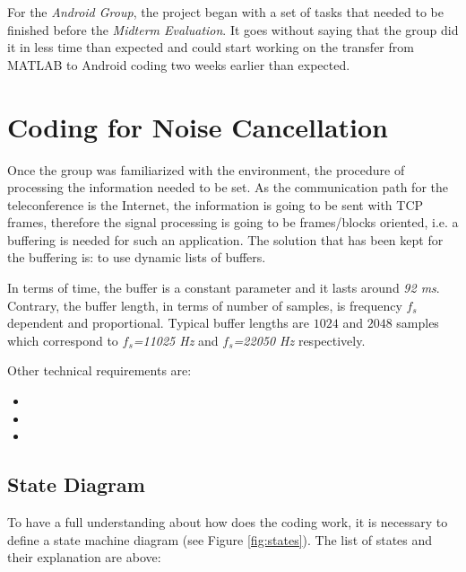 \documentclass[11pt,a4paper,english]{book}  %
\theoremstyle{definition}  %
\theoremstyle{plain}  %
\theoremstyle{remark}  %
\begin{document}
For the \textit{Android Group}, the project began with a set of tasks that needed to be finished before the \textit{Midterm Evaluation}. It goes without saying that the group did it in less time than expected and could start working on the transfer from MATLAB to Android coding two weeks earlier than expected.

\section{Coding for Noise Cancellation}
\label{sec:coding}

Once the group was familiarized with the environment, the procedure of processing the information needed to be set. As the communication path for the teleconference is the Internet, the information is going to be sent with TCP frames, therefore the signal processing is going to be frames/blocks oriented, i.e. a buffering is needed for such an application. The solution that has been kept for the buffering is: to use dynamic lists of buffers.

In terms of time, the buffer is a constant parameter and it lasts around \textit{92 ms}. Contrary, the buffer length, in terms of number of samples, is frequency $f_{s}$ dependent and proportional. Typical buffer lengths are $1024$ and $2048$ samples which correspond to \textit{$f_{s}$=11025 Hz} and \textit{$f_{s}$=22050 Hz} respectively.

Other technical requirements are:

\begin{itemize}
\item
\item
\item
\end{itemize}


	\subsection{State Diagram}
	
	To have a full understanding about how does the coding work, it is necessary to define a state machine diagram (see Figure \ref{fig:states}). The list of states and their explanation are above:
	
\end{document}
